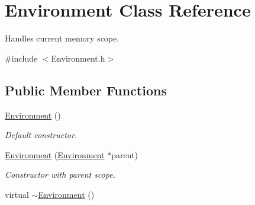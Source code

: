 \hypertarget{classEnvironment}{}\section{Environment Class Reference}
\label{classEnvironment}


Handles current memory scope.  




{\ttfamily \#include $<$Environment.\+h$>$}

\subsection*{Public Member Functions}
\begin{DoxyCompactItemize}
\item 
\hypertarget{classEnvironment_a8b427c4448d8b7536666837521b9e83d}{}\hyperlink{classEnvironment_a8b427c4448d8b7536666837521b9e83d}{Environment} ()\label{classEnvironment_a8b427c4448d8b7536666837521b9e83d}

\begin{DoxyCompactList}\small\item\em Default constructor. \end{DoxyCompactList}\item 
\hyperlink{classEnvironment_a030253266b5d549059c14984dfbb31da}{Environment} (\hyperlink{classEnvironment}{Environment} $\ast$parent)
\begin{DoxyCompactList}\small\item\em Constructor with parent scope. \end{DoxyCompactList}\item 
\hypertarget{classEnvironment_a8e294735187880dd3d59be10c425b29d}{}virtual \hyperlink{classEnvironment_a8e294735187880dd3d59be10c425b29d}{$\sim$\+Environment} ()\label{classEnvironment_a8e294735187880dd3d59be10c425b29d}


\end{DoxyCompactItemize}
